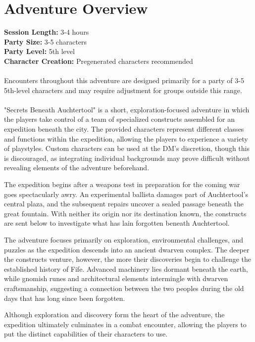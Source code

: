 \section*{\LARGE Adventure Overview}
{\entryfont\textbf{Session Length:} 3-4 hours\\
\textbf{Party Size:} 3-5 characters\\
\textbf{Party Level:} 5th level\\
\textbf{Character Creation:} Pregenerated characters recommended\\\\
Encounters throughout this adventure are designed primarily for a party of 3-5 5th-level characters and may require adjustment for groups outside this range.\\\\
"Secrets Beneath Auchtertool" is a short, exploration-focused adventure in which the players take control of a team of specialized constructs assembled for an expedition beneath the city. The provided characters represent different classes and functions within the expedition, allowing the players to experience a variety of playstyles. Custom characters can be used at the DM's discretion, though this is discouraged, as integrating individual backgrounds may prove difficult without revealing elements of the adventure beforehand.

The expedition begins after a weapons test in preparation for the coming war goes spectacularly awry. An experimental ballista damages part of Auchtertool's central plaza, and the subsequent repairs uncover a sealed passage beneath the great fountain. With neither its origin nor its destination known, the constructs are sent below to investigate what has lain forgotten beneath Auchtertool.

The adventure focuses primarily on exploration, environmental challenges, and puzzles as the expedition descends into an ancient dwarven complex. The deeper the constructs venture, however, the more their discoveries begin to challenge the established history of Fife. Advanced machinery lies dormant beneath the earth, while gnomish runes and architectural elements intermingle with dwarven craftsmanship, suggesting a connection between the two peoples during the old days that has long since been forgotten.

Although exploration and discovery form the heart of the adventure, the expedition ultimately culminates in a combat encounter, allowing the players to put the distinct capabilities of their characters to use.}